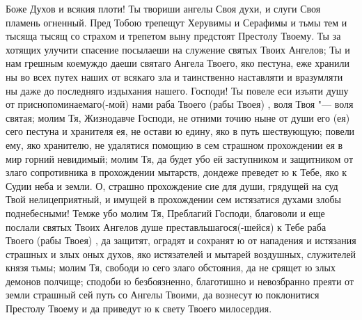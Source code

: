 \begin{mymulticols}


Боже Духов и всякия плоти! Ты твориши ангелы Своя духи, и слуги Своя пламень огненный. Пред Тобою трепещут Херувимы и Серафимы и тьмы тем и тысяща тысящ со страхом и трепетом выну предстоят Престолу Твоему. Ты за хотящих улучити спасение посылаеши на служение святых Твоих Ангелов; Ты и нам грешным коемуждо даеши святаго Ангела Твоего, яко пестуна, еже хранили ны во всех путех наших от всякаго зла и таинственно наставляти и вразумляти ны даже до последняго издыхания нашего. Господи! Ты повеле еси изъяти душу от приснопоминаемаго(-мой) нами раба Твоего (рабы Твоея) , воля Твоя "--- воля святая; молим Тя, Жизнодавче Господи, не отними точию ныне от души его (ея) сего пестуна и хранителя ея, не остави ю едину, яко в путь шествующую; повели ему, яко хранителю, не удалятися помощию в сем страшном прохождении ея в мир горний невидимый; молим Тя, да будет убо ей заступником и защитником от злаго сопротивника в прохождении мытарств, дондеже преведет ю к Тебе, яко к Судии неба и земли. О, страшно прохождение сие для души, грядущей на суд Твой нелицеприятный, и имущей в прохождении сем истязатися духами злобы поднебесными! Темже убо молим Тя, Преблагий Господи, благоволи и еще послали святых Твоих Ангелов душе преставльшагося(-шейся) к Тебе раба Твоего (рабы Твоея) , да защитят, оградят и сохранят ю от нападения и истязания страшных и злых оных духов, яко истязателей и мытарей воздушных, служителей князя тьмы; молим Тя, свободи ю сего злаго обстояния, да не срящет ю злых демонов полчище; сподоби ю безбоязненно, благотишно и невозбранно преяти от земли страшный сей путь со Ангелы Твоими, да вознесут ю поклонитися Престолу Твоему и да приведут ю к свету Твоего милосердия.

\end{mymulticols}

\mychapterending

